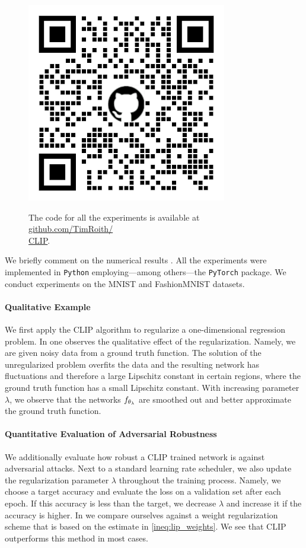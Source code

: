 \begin{figure}
\begin{center}
\includegraphics[width=.4\textwidth]{atelier/CLIP/CLIPQR.png}
\end{center}
The code for all the experiments is available at \href{https://github.com/TimRoith/CLIP}{github.com/TimRoith/}\\
\href{https://github.com/TimRoith/CLIP}{CLIP}.
\end{figure}
We briefly comment on the numerical results \cite{bungert2021clip}. All the experiments were implemented in \texttt{Python} \cite{van1995python} employing---among others---the \texttt{PyTorch} \cite{paszke2019pytorch} package. We conduct experiments on the MNIST \cite{leCun10} and FashionMNIST \cite{Han17} datasets.

\paragraph{Qualitative Example} We first apply the CLIP algorithm to regularize a one-dimensional regression problem. In \cite[Fig. 2]{bungert2021clip} one observes the qualitative effect of the regularization. Namely, we are given noisy data from a ground truth function. The solution of the unregularized problem overfits the data and the resulting network has fluctuations and therefore a large Lipschitz constant in certain regions, where the ground truth function has a small Lipschitz constant. With increasing parameter $\lambda$, we observe that the networks $f_{\theta_\lambda}$ are smoothed out and better approximate the ground truth function.
%
\paragraph{Quantitative Evaluation of Adversarial Robustness} We additionally evaluate how robust a CLIP trained network is against adversarial attacks. Next to a standard learning rate scheduler, we also update the regularization parameter $\lambda$ throughout the training process. Namely, we choose a target accuracy and evaluate the loss on a validation set after each epoch. If this accuracy is less than the target, we decrease $\lambda$ and increase it if the accuracy is higher. In \cite[Tab. 1]{bungert2021clip} we compare ourselves against a weight regularization scheme that is based on the estimate in \cref{ineq:lip_weights}. We see that CLIP outperforms this method in most cases.
%
%
%
%
%
%
%
%
\clearpage%
%
